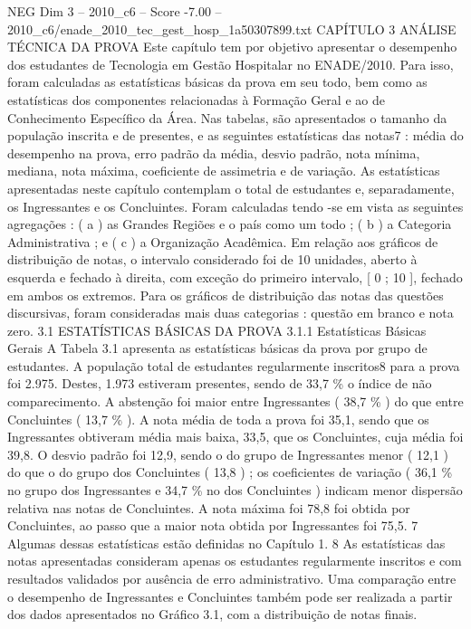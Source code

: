 \begin{textsample}{NEG Dim 3 – 2010\_c6 – Score -7.00 – 2010\_c6/enade\_2010\_tec\_gest\_hosp\_1a50307899.txt}  \label{ex:f3_neg_014}
CAPÍTULO 3 ANÁLISE TÉCNICA DA PROVA Este capítulo tem por objetivo apresentar o desempenho dos estudantes de Tecnologia em Gestão Hospitalar no ENADE/2010.
Para isso, foram calculadas as estatísticas básicas da prova em seu todo, bem como as estatísticas dos componentes relacionadas à Formação Geral e ao de Conhecimento Específico da Área.
Nas tabelas, são apresentados o tamanho da população inscrita e de presentes, e as seguintes estatísticas das notas7 : média do desempenho na prova, erro padrão da média, desvio padrão, nota mínima, mediana, nota máxima, coeficiente de assimetria e de variação.
As estatísticas apresentadas neste capítulo contemplam o total de estudantes e, separadamente, os Ingressantes e os Concluintes.
Foram calculadas tendo -se em vista as seguintes agregações : ( a ) as Grandes Regiões e o país como um todo ; ( b ) a Categoria Administrativa ; e ( c ) a Organização Acadêmica.
Em relação aos gráficos de distribuição de notas, o intervalo considerado foi de 10 unidades, aberto à esquerda e fechado à direita, com exceção do primeiro intervalo, [ 0 ; 10 ], fechado em ambos os extremos.
Para os gráficos de distribuição das notas das questões discursivas, foram consideradas mais duas categorias : questão em branco e nota zero. 3.1 ESTATÍSTICAS BÁSICAS DA PROVA 3.1.1 Estatísticas Básicas Gerais A Tabela 3.1 apresenta as estatísticas básicas da prova por grupo de estudantes.
A população total de estudantes regularmente inscritos8 para a prova foi 2.975.
Destes, 1.973 estiveram presentes, sendo de 33,7 \% o índice de não comparecimento.
A abstenção foi maior entre Ingressantes ( 38,7 \% ) do que entre Concluintes ( 13,7 \% ).
A nota média de toda a prova foi 35,1, sendo que os Ingressantes obtiveram média mais baixa, 33,5, que os Concluintes, cuja média foi 39,8.
O desvio padrão foi 12,9, sendo o do grupo de Ingressantes menor ( 12,1 ) do que o do grupo dos Concluintes ( 13,8 ) ; os coeficientes de variação ( 36,1 \% no grupo dos Ingressantes e 34,7 \% no dos Concluintes ) indicam menor dispersão relativa nas notas de Concluintes.
A nota máxima foi 78,8 foi obtida por Concluintes, ao passo que a maior nota obtida por Ingressantes foi 75,5. 7 Algumas dessas estatísticas estão definidas no Capítulo 1. 8 As estatísticas das notas apresentadas consideram apenas os estudantes regularmente inscritos e com resultados validados por ausência de erro administrativo.
Uma comparação entre o desempenho de Ingressantes e Concluintes também pode ser realizada a partir dos dados apresentados no Gráfico 3.1, com a distribuição de notas finais.

\end{textsample}
